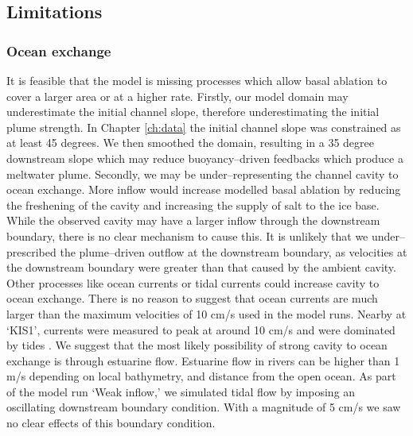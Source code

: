 \subsection{Limitations}

\subsubsection{Ocean exchange}
It is feasible that the model is missing processes which allow basal ablation to cover a larger area or at a higher rate. 
Firstly, our model domain may underestimate the initial channel slope, therefore underestimating the initial plume strength. In Chapter \ref{ch:data} the initial channel slope was constrained as at least 45 degrees. We then smoothed the domain, resulting in a 35 degree downstream slope which may reduce buoyancy--driven feedbacks which produce a meltwater plume. 
Secondly, we may be under--representing the channel cavity to ocean exchange. More inflow would increase modelled basal ablation by reducing the freshening of the cavity and increasing the supply of salt to the ice base. While the observed cavity may have a larger inflow through the downstream boundary, there is no clear  mechanism to cause this. It is unlikely that we under--prescribed the plume--driven outflow at the downstream boundary, as velocities at the downstream boundary were greater than that caused by the ambient cavity. Other processes like ocean currents or tidal currents could increase cavity to ocean exchange. 
There is no reason to suggest that ocean currents are much larger than the maximum velocities of 10 cm/s used in the model runs. Nearby at `KIS1', currents were measured to peak at around 10 cm/s and were dominated by tides \citep{robinson2020ice}. 
We suggest that the most likely possibility of strong cavity to ocean exchange is through estuarine flow. Estuarine flow in rivers can be higher than 1 m/s \citep{nepf1996intratidal} depending on local bathymetry, and distance from the open ocean. As part of the model run `Weak inflow,' we simulated tidal flow by imposing an oscillating downstream boundary condition. With a magnitude of 5 cm/s we saw no clear effects of this boundary condition. 

